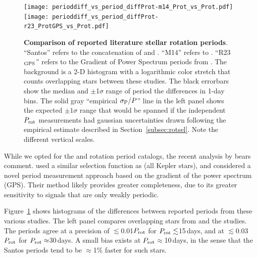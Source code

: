 \documentclass[11pt,twocolumn,tighten,linenumbers]{aastex63}
\begin{document}
\begin{figure}[!b]
  \begin{center}
    \leavevmode
      \texttt{[image: perioddiff\_vs\_period\_diffProt-m14\_Prot\_vs\_Prot.pdf]}
      \texttt{[image: perioddiff\_vs\_period\_diffProt-r23\_ProtGPS\_vs\_Prot.pdf]}
  \end{center}
  \vspace{-0.6cm}
  \caption{
    {\bf Comparison of reported literature stellar rotation periods}.
    ``Santos'' refers to the concatenation of \citet{Santos_2019} and
    \citet{Santos_2021}.  ``M14'' refers to \citet{McQuillan_2014}.
    ``R23$_{\rm GPS}$'' refers to the Gradient of Power Spectrum
    periods from \citet{Reinhold2023}.  The background is a 2-D
    histogram with a logarithmic color stretch that counts overlapping
    stars between these studies.  The black errorbars show the median
    and $\pm$1$\sigma$ range of period the differences in 1-day bins.
    The
    solid gray ``empirical $\sigma_{\rm P}/P$'' line in the left panel
    shows the expected $\pm 1\sigma$ range that would be spanned if
    the independent $P_{\rm rot}$ measurements had gaussian
    uncertainties drawn following the empirical estimate described in
    Section~\ref{subsec:rotsel}.
    Note the different vertical scales.
    \label{fig:perioddiff}
  }
\end{figure}

While we opted for the  and
 rotation period catalogs, the recent
analysis by \citet{Reinhold2023} bears comment.  \citet{Reinhold2023}
used a similar selection function as \citeauthor{Santos_2021}
(all Kepler stars), and considered a novel period measurement
approach based on the gradient of the power spectrum (GPS).  Their method
likely provides greater completeness, due to its greater sensitivity
to signals that are only weakly periodic.  

Figure~\ref{fig:perioddiff} shows histograms of the differences
between reported periods from these various studies.  The left panel
compares overlapping stars from \citet{McQuillan_2014} and
the \citeauthor{Santos_2021} studies.  The periods agree at a precision of
$\lesssim$0.01$P_{\rm rot}$ for $P_{\rm rot}\lesssim$15\,days, and at
$\lesssim$0.03$P_{\rm rot}$ for $P_{\rm rot}\approx$30\,days.  
A small bias exists at $P_{\rm rot}$$\approx$10\,days,
in the sense that the Santos periods tend to be $\approx$1\% faster
for such stars.
\end{document}
